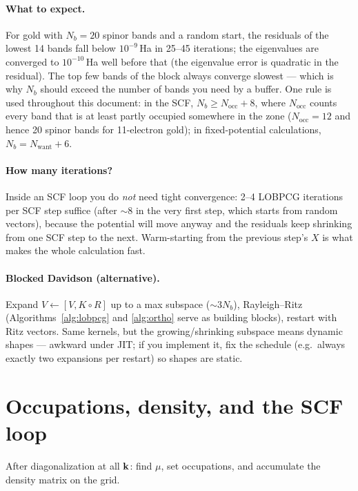 \paragraph{What to expect.} For gold with $N_b = 20$ spinor bands and a
random start, the residuals of the lowest 14 bands fall below
$10^{-9}$\,Ha in 25--45 iterations; the eigenvalues are converged to
$10^{-10}$\,Ha well before that (the eigenvalue error is quadratic in the
residual). The top few bands of the block always converge slowest ---
which is why $N_b$ should exceed the number of bands you need by a buffer.
One rule is used throughout this document: in the SCF,
$N_b \ge N_{\mathrm{occ}} + 8$, where $N_{\mathrm{occ}}$ counts every band
that is at least partly occupied somewhere in the zone ($N_{\mathrm{occ}} =
12$ and hence 20 spinor bands for 11-electron gold); in
fixed-potential calculations, $N_b = N_{\mathrm{want}} + 6$.

\paragraph{How many iterations?} Inside an SCF loop you do \emph{not} need
tight convergence: 2--4 LOBPCG iterations per SCF step suffice (after
$\sim8$ in the very first step, which starts from random vectors), because
the potential will move anyway and the residuals keep shrinking from one
SCF step to the next. Warm-starting from the previous step's $X$ is what
makes the whole calculation fast.

\paragraph{Blocked Davidson (alternative).} Expand $V \gets [V, K\circ R]$ up
to a max subspace ($\sim 3 N_b$), Rayleigh--Ritz (Algorithms~\ref{alg:lobpcg}
and \ref{alg:ortho} serve as building blocks), restart with Ritz vectors.
Same kernels, but the growing/shrinking subspace means dynamic shapes ---
awkward under JIT; if you implement it, fix the schedule (e.g.\ always
exactly two expansions per restart) so shapes are static.

\section{Occupations, density, and the SCF loop}

After diagonalization at all $\mathbf{k}$: find $\mu$, set occupations, and
accumulate the density matrix on the grid.

